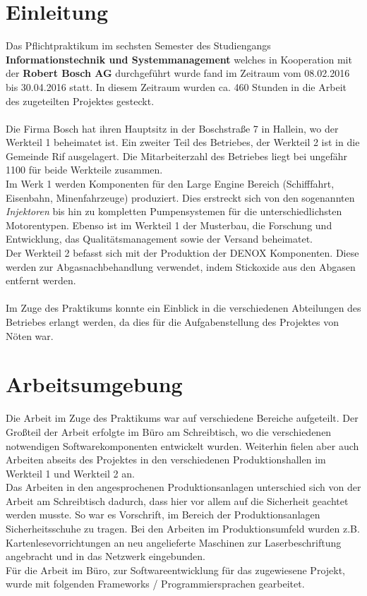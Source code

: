 \chapter{Einleitung}
\label{Einleitung}

Das Pflichtpraktikum im sechsten Semester des Studiengangs \textbf{Informationstechnik und Systemmanagement} welches in Kooperation mit der \textbf{Robert Bosch AG} durchgeführt wurde fand im Zeitraum vom 08.02.2016 bis 30.04.2016 statt. In diesem Zeitraum wurden ca. 460 Stunden in die Arbeit des zugeteilten Projektes gesteckt.\\\\
Die Firma Bosch hat ihren Hauptsitz in der Boschstraße 7 in Hallein, wo der Werkteil 1 beheimatet ist. Ein zweiter Teil des Betriebes, der Werkteil 2 ist in die Gemeinde Rif ausgelagert.  Die Mitarbeiterzahl des Betriebes liegt bei ungefähr 1100 für beide Werkteile zusammen.\\
Im Werk 1 werden Komponenten für den Large Engine Bereich (Schifffahrt, Eisenbahn, Minenfahrzeuge) produziert. Dies erstreckt sich von den sogenannten \textit{Injektoren} bis hin zu kompletten Pumpensystemen für die unterschiedlichsten Motorentypen. Ebenso ist im Werkteil 1 der Musterbau, die Forschung und Entwicklung, das Qualitätsmanagement sowie der Versand beheimatet. \\
Der Werkteil 2 befasst sich mit der Produktion der DENOX Komponenten. Diese werden zur Abgasnachbehandlung verwendet, indem Stickoxide aus den Abgasen entfernt werden.\\\\
Im Zuge des Praktikums konnte ein Einblick in die verschiedenen Abteilungen des Betriebes erlangt werden, da dies für die Aufgabenstellung des Projektes von Nöten war.



\chapter{Arbeitsumgebung}
\label{Arbeitsumgebung}
Die Arbeit im Zuge des Praktikums war auf verschiedene Bereiche aufgeteilt. Der Großteil der Arbeit erfolgte im Büro am Schreibtisch, wo die verschiedenen notwendigen Softwarekomponenten entwickelt wurden. Weiterhin fielen aber auch Arbeiten abseits des Projektes in den verschiedenen Produktionshallen im Werkteil 1 und Werkteil 2 an.\\
 Das Arbeiten in den angesprochenen Produktionsanlagen unterschied sich von der Arbeit am Schreibtisch dadurch, dass hier vor allem auf die Sicherheit geachtet werden musste. So war es Vorschrift, im Bereich der Produktionsanlagen Sicherheitsschuhe zu tragen. Bei den Arbeiten im Produktionsumfeld wurden z.B. Kartenlesevorrichtungen an neu angelieferte Maschinen zur Laserbeschriftung angebracht und in das Netzwerk eingebunden.\\
 Für die Arbeit im Büro, zur Softwareentwicklung für das zugewiesene Projekt, wurde mit folgenden Frameworks / Programmiersprachen gearbeitet.
 
